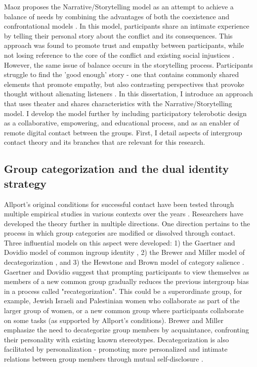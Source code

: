 \documentclass[dissertation,math,vertlayout,pdfa,colorlinks]{aaltoseries}
\begin{document}
Maoz proposes the Narrative/Storytelling model as an attempt to achieve a balance of needs by combining the advantages of both the coexistence and confrontational models \cite{maozDoesContactWork2011}. In this model, participants share an intimate experience by telling their personal story about the conflict and its consequences. This approach was found to promote trust and empathy between participants, while not losing reference to the core of the conflict and existing social injustices \cite{bar-onConciliationStorytellingVictimhood2002,bar-onTellYourLife2006,bar-onStorytellingWayWork2004}. However, the same issue of balance occurs in the storytelling process. Participants struggle to find the 'good enough' story - one that contains commonly shared elements that promote empathy, but also contrasting perspectives that provoke thought without alienating listeners \cite{bar-onTellYourLife2006}. In this dissertation, I introduce an approach that uses theater and shares characteristics with the Narrative/Storytelling model. I develop the model further by including participatory telerobotic design as a collaborative, empowering, and educational process, and as an enabler of remote digital contact between the groups. First, I detail aspects of intergroup contact theory and its branches that are relevant for this research.

\subsection{Group categorization and the dual identity strategy}
\label{sec:dual_identity}
Allport's original conditions for successful contact have been tested through multiple empirical studies in various contexts over the years \cite{pettigrewDoesIntergroupContact2013}. Researchers have developed the theory further in multiple directions. One direction pertains to the process in which group categories are modified or dissolved through contact. Three influential models on this aspect were developed: 1) the Gaertner and Dovidio model of common ingroup identity \cite{gaertnerReducingIntergroupBias2000}, 2) the Brewer and Miller model of decategorization \cite{brewerContactHypothesisTheoretical1984}, and 3) the Hewstone and Brown model of category salience \cite{hewstoneContactNotEnough1986}. Gaertner and Dovidio suggest that prompting participants to view themselves as members of a new common group gradually reduces the previous intergroup bias in a process called "recategorization". This could be a superordinate group, for example, Jewish Israeli and Palestinian women who collaborate as part of the larger group of women, or a new common group where participants collaborate on some tasks \cite{gaertnerCategorizationRecategorizationIntergroup2005} (as supported by Allport's conditions). Brewer and Miller emphasize the need to decategorize group members by acquaintance, confronting their personality with existing known stereotypes. Decategorization is also facilitated by personalization - promoting more personalized and intimate relations between group members through mutual self-disclosure \cite{millerPersonalizationPromiseContact2002}.
\end{document}

